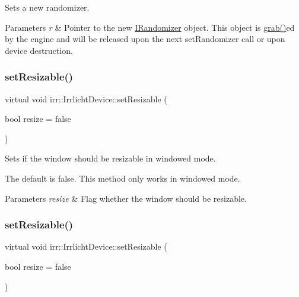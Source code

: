 Sets a new randomizer. 


\begin{DoxyParams}{Parameters}
{\em r} & Pointer to the new \hyperlink{classirr_1_1IRandomizer}{I\+Randomizer} object. This object is \hyperlink{classirr_1_1IReferenceCounted_a396f9cdbe311ada278626477b3c6f0f5}{grab()}\textquotesingle{}ed by the engine and will be released upon the next set\+Randomizer call or upon device destruction. \\
\hline
\end{DoxyParams}
\mbox{\label{classirr_1_1IrrlichtDevice_a4911502bd085d2d87474ff12959bc341}} 
\subsubsection{\texorpdfstring{set\+Resizable()}{setResizable()}\hspace{0.1cm}{\footnotesize\ttfamily [1/3]}}
{\footnotesize\ttfamily virtual void irr\+::\+Irrlicht\+Device\+::set\+Resizable (\begin{DoxyParamCaption}\item[{bool}]{resize = {\ttfamily false} }\end{DoxyParamCaption})\hspace{0.3cm}{\ttfamily [pure virtual]}}



Sets if the window should be resizable in windowed mode. 

The default is false. This method only works in windowed mode. 
\begin{DoxyParams}{Parameters}
{\em resize} & Flag whether the window should be resizable. \\
\hline
\end{DoxyParams}
\mbox{\label{classirr_1_1IrrlichtDevice_a4911502bd085d2d87474ff12959bc341}} 
\subsubsection{\texorpdfstring{set\+Resizable()}{setResizable()}\hspace{0.1cm}{\footnotesize\ttfamily [2/3]}}
{\footnotesize\ttfamily virtual void irr\+::\+Irrlicht\+Device\+::set\+Resizable (\begin{DoxyParamCaption}\item[{bool}]{resize = {\ttfamily false} }\end{DoxyParamCaption})\hspace{0.3cm}{\ttfamily [pure virtual]}}



